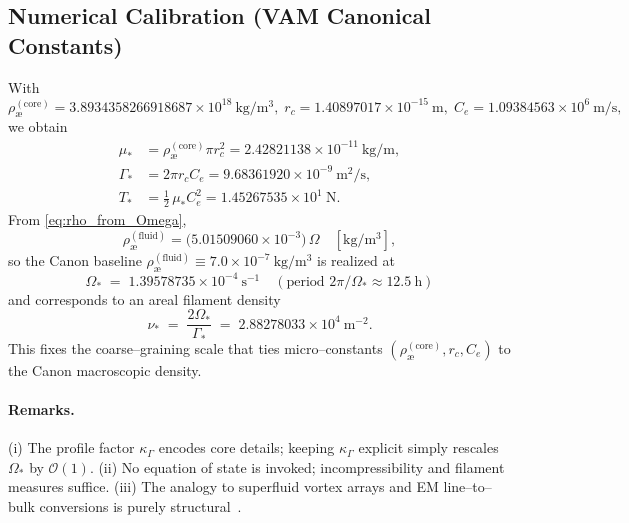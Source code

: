 \documentclass[11pt, a4paper]{article}
\begin{document}
\subsection{Numerical Calibration (VAM Canonical Constants)}
With
\[
    \rho_{\text{\ae}}^{(\text{core})}=3.8934358266918687\times10^{18}\ \mathrm{kg/m^3},\;
    r_c=1.40897017\times10^{-15}\ \mathrm{m},\;
    C_e=1.09384563\times10^{6}\ \mathrm{m/s},
\]
we obtain
\begin{align*}
    \mu_\ast &= \rho_{\text{\ae}}^{(\text{core})}\pi r_c^2
    = 2.42821138\times10^{-11}\ \mathrm{kg/m},\\
    \Gamma_\ast &= 2\pi r_c C_e
    = 9.68361920\times10^{-9}\ \mathrm{m^2/s},\\
    T_\ast &= \tfrac12\,\mu_\ast C_e^2
    = 1.45267535\times10^{1}\ \mathrm{N}.
\end{align*}
From \eqref{eq:rho_from_Omega},
\[
    \rho_{\text{\ae}}^{(\text{fluid})}
    = \bigl(5.01509060\times10^{-3}\bigr)\,\Omega\quad [\mathrm{kg/m^3}],
\]
so the Canon baseline \( \rho_{\text{\ae}}^{(\text{fluid})}\equiv 7.0\times10^{-7}\ \mathrm{kg/m^3}\) is realized at
\[
    \boxed{\;
    \Omega_\ast \;=\; 1.39578735\times10^{-4}\ \mathrm{s^{-1}}
    \quad (\text{period } 2\pi/\Omega_\ast \approx 12.5\ \mathrm{h})
    \;}
\]
and corresponds to an areal filament density
\[
    \nu_\ast \;=\; \frac{2\Omega_\ast}{\Gamma_\ast}
    \;=\; 2.88278033\times10^{4}\ \mathrm{m^{-2}}.
\]
This fixes the coarse–graining scale that ties micro–constants \((\rho_{\text{\ae}}^{(\text{core})}, r_c, C_e)\) to the Canon macroscopic density.

\paragraph{Remarks.}
(i) The profile factor \(\kappa_\Gamma\) encodes core details; keeping \(\kappa_\Gamma\) explicit simply rescales \(\Omega_\ast\) by \(\mathcal{O}(1)\). (ii) No equation of state is invoked; incompressibility and filament measures suffice. (iii) The analogy to superfluid vortex arrays and EM line–to–bulk conversions is purely structural~\cite{Feynman1955,Donnelly1991,Jackson1999,Saffman1992}.
\end{document}
